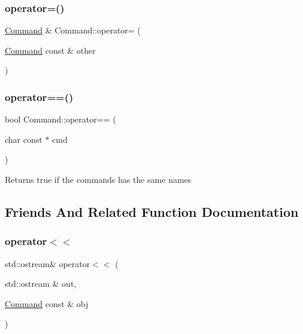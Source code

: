 \subsubsection{\texorpdfstring{operator=()}{operator=()}}
{\footnotesize\ttfamily \hyperlink{classCommand}{Command} \& Command\+::operator= (\begin{DoxyParamCaption}\item[{\hyperlink{classCommand}{Command} const \&}]{other }\end{DoxyParamCaption})}

\mbox{\label{classCommand_a75d6d67687c9d29e47ce9e80540bbd1e}} 
\subsubsection{\texorpdfstring{operator==()}{operator==()}}
{\footnotesize\ttfamily bool Command\+::operator== (\begin{DoxyParamCaption}\item[{char const $\ast$}]{cmd }\end{DoxyParamCaption})}

\begin{DoxyReturn}{Returns}
true if the commands has the same names 
\end{DoxyReturn}


\subsection{Friends And Related Function Documentation}
\mbox{\label{classCommand_a0a193e228644a3735c309d8b2b5b9899}} 
\subsubsection{\texorpdfstring{operator$<$$<$}{operator<<}}
{\footnotesize\ttfamily std\+::ostream\& operator$<$$<$ (\begin{DoxyParamCaption}\item[{std\+::ostream \&}]{out,  }\item[{\hyperlink{classCommand}{Command} const \&}]{obj }\end{DoxyParamCaption})\hspace{0.3cm}{\ttfamily [friend]}}



